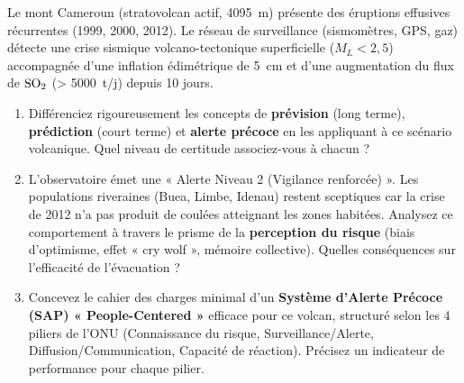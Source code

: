 \documentclass[11pt]{article}
\begin{document}
\begin{exercice}
    Le mont Cameroun (stratovolcan actif, \SI{4095}{m}) présente des éruptions effusives récurrentes (1999, 2000, 2012). Le réseau de surveillance (sismomètres, GPS, gaz) détecte une crise sismique volcano-tectonique superficielle ($M_L < 2,5$) accompagnée d'une inflation édimétrique de \SI{5}{cm} et d'une augmentation du flux de $\ce{SO2}$ (\SI{> 5000}{t/j}) depuis 10 jours.
    \begin{enumerate}
        \item Différenciez rigoureusement les concepts de \textbf{prévision} (long terme), \textbf{prédiction} (court terme) et \textbf{alerte précoce} en les appliquant à ce scénario volcanique. Quel niveau de certitude associez-vous à chacun ?
        \item L'observatoire émet une « Alerte Niveau 2 (Vigilance renforcée) ». Les populations riveraines (Buea, Limbe, Idenau) restent sceptiques car la crise de 2012 n'a pas produit de coulées atteignant les zones habitées. Analysez ce comportement à travers le prisme de la \textbf{perception du risque} (biais d'optimisme, effet « cry wolf », mémoire collective). Quelles conséquences sur l'efficacité de l'évacuation ?
        \item Concevez le cahier des charges minimal d'un \textbf{Système d'Alerte Précoce (SAP) « People-Centered »} efficace pour ce volcan, structuré selon les 4 piliers de l'ONU (Connaissance du risque, Surveillance/Alerte, Diffusion/Communication, Capacité de réaction). Précisez un indicateur de performance pour chaque pilier.
    \end{enumerate}
\end{exercice}
\end{document}
